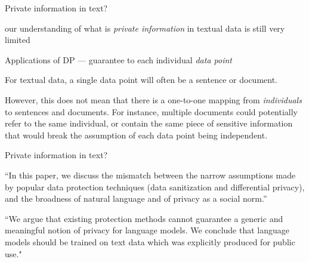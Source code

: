 \documentclass[12pt,aspectratio=169,handout]{beamer}
\begin{document}
\begin{frame}{Private information in text?}


our understanding of what is \textit{private information} in textual data is still very limited

Applications of DP --- guarantee to each individual \textit{data point}

For textual data, a single data point will often be a sentence or document.

However, this does not mean that there is a one-to-one mapping from \textit{individuals} to sentences and documents.
For instance, multiple documents could potentially refer to the same individual, or contain the same piece of sensitive information that would break the assumption of each data point being independent.


\end{frame}


\begin{frame}{Private information in text?}


``In this paper, we discuss the mismatch between the narrow assumptions made by popular data protection techniques (data sanitization and differential privacy), and the broadness of natural language and of privacy as a social norm.''


``We argue that existing protection methods cannot guarantee a generic and meaningful notion of privacy for language models. We conclude that language models should be trained on text data which was explicitly produced for public use."


\end{frame}
\end{document}

